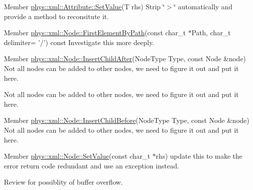 \label{todo__todo000041}
\hypertarget{todo__todo000041}{}
 
\begin{DoxyDescription}
\item[Member \hyperlink{classphys_1_1xml_1_1Attribute_af9b12723a227b833d7f8986a524b0e48}{phys::xml::Attribute::SetValue}(T rhs) ]Strip \char`\"{}$>$\char`\"{} automatically and provide a method to reconsitute it. 
\end{DoxyDescription}

\label{todo__todo000050}
\hypertarget{todo__todo000050}{}
 
\begin{DoxyDescription}
\item[Member \hyperlink{classphys_1_1xml_1_1Node_af2a9ac5c4e3252dca0e17720de093a9a}{phys::xml::Node::FirstElementByPath}(const char\_\-t $\ast$Path, char\_\-t delimiter= '/') const  ]Investigate this more deeply. 
\end{DoxyDescription}

\label{todo__todo000048}
\hypertarget{todo__todo000048}{}
 
\begin{DoxyDescription}
\item[Member \hyperlink{classphys_1_1xml_1_1Node_affc4d9cc0ea7c89bac58d91a432af2ef}{phys::xml::Node::InsertChildAfter}(NodeType Type, const Node \&node) ]Not all nodes can be added to other nodes, we need to figure it out and put it here. 

Not all nodes can be added to other nodes, we need to figure it out and put it here. 
\end{DoxyDescription}

\label{todo__todo000043}
\hypertarget{todo__todo000043}{}
 
\begin{DoxyDescription}
\item[Member \hyperlink{classphys_1_1xml_1_1Node_a691684896ab5d29a634415e745aaec7a}{phys::xml::Node::InsertChildBefore}(NodeType Type, const Node \&node) ]Not all nodes can be added to other nodes, we need to figure it out and put it here. 
\end{DoxyDescription}

\label{todo__todo000042}
\hypertarget{todo__todo000042}{}
 
\begin{DoxyDescription}
\item[Member \hyperlink{classphys_1_1xml_1_1Node_a50ff9948dac721339561ed3442fb7034}{phys::xml::Node::SetValue}(const char\_\-t $\ast$rhs) ]update this to make the error return code redundant and use an exception instead. 

Review for possiblity of buffer overflow. 
\end{DoxyDescription}